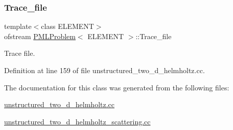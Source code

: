 \subsubsection{\texorpdfstring{Trace\+\_\+file}{Trace\_file}}
{\footnotesize\ttfamily template$<$class E\+L\+E\+M\+E\+NT$>$ \\
ofstream \hyperlink{classPMLProblem}{P\+M\+L\+Problem}$<$ E\+L\+E\+M\+E\+NT $>$\+::Trace\+\_\+file\hspace{0.3cm}{\ttfamily [private]}}



Trace file. 



Definition at line 159 of file unstructured\+\_\+two\+\_\+d\+\_\+helmholtz.\+cc.



The documentation for this class was generated from the following files\+:\begin{DoxyCompactItemize}
\item 
\hyperlink{unstructured__two__d__helmholtz_8cc}{unstructured\+\_\+two\+\_\+d\+\_\+helmholtz.\+cc}\item 
\hyperlink{unstructured__two__d__helmholtz__scattering_8cc}{unstructured\+\_\+two\+\_\+d\+\_\+helmholtz\+\_\+scattering.\+cc}\end{DoxyCompactItemize}
